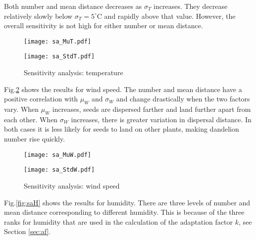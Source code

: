 \documentclass[12pt]{article}
\begin{document}
			Both number and mean distance decreases as $\sigma_T$ increases.  They decrease relatively slowly below $\sigma_T = 5^\circ$C and rapidly above that value.  However, the overall sensitivity is not high for either number or mean distance.
			
			\begin{figure}[htbp]
				\centering
				\begin{minipage}{0.04\textwidth}\end{minipage}
				\begin{minipage}{0.46\textwidth}
					\texttt{[image: sa\_MuT.pdf]}
				\end{minipage}
				\begin{minipage}{0.46\textwidth}
					\texttt{[image: sa\_StdT.pdf]}
				\end{minipage}
				\begin{minipage}{0.04\textwidth}\end{minipage}
				\caption{Sensitivity analysis: temperature}
				\label{fig:saT}
			\end{figure}
			
			Fig.\ref{fig:saW} shows the results for wind speed.  The number and mean distance have a positive correlation with $\mu_W$ and $\sigma_W$ and change drastically when the two factors vary.  When $\mu_W$ increases, seeds are dispersed farther and land further apart from each other.  When $\sigma_W$ increases, there is greater variation in dispersal distance.  In both cases it is less likely for seeds to land on other plants, making dandelion number rise quickly.
			
			\begin{figure}[htbp]
				\centering
				\begin{minipage}{0.04\textwidth}\end{minipage}
				\begin{minipage}{0.46\textwidth}
					\texttt{[image: sa\_MuW.pdf]}
				\end{minipage}
				\begin{minipage}{0.46\textwidth}
					\texttt{[image: sa\_StdW.pdf]}
				\end{minipage}
				\caption{Sensitivity analysis: wind speed}
				\label{fig:saW}
			\end{figure}
			
			Fig.\ref{fig:saH} shows the results for humidity.  There are three levels of number and mean distance corresponding to different humidity.  This is because of the three ranks for humidity that are used in the calculation of the adaptation factor $k$, see Section \ref{sec:af}.
			
\end{document}
